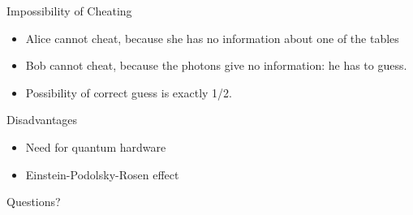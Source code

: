 \documentclass{beamer}
\begin{document}
\begin{frame}{Impossibility of Cheating}
\begin{itemize}
    \item Alice cannot cheat, because she has no information about one of the tables
    \item Bob cannot cheat, because the photons give no information: he has to guess.
    \item Possibility of correct guess is exactly 1/2.
\end{itemize}
\end{frame}

\begin{frame}{Disadvantages}
\begin{itemize}
    \item Need for quantum hardware
    \item Einstein-Podolsky-Rosen effect
\end{itemize}
\end{frame}

\begin{frame}{Questions?}

\end{frame}
 
\end{document}
